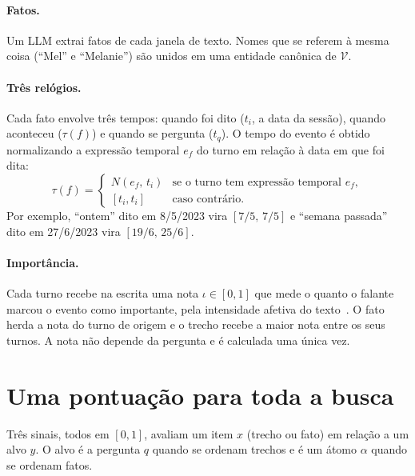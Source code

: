 \documentclass[11pt]{article}
\theoremstyle{definition}
\theoremstyle{plain}
\newcommand{\V}{\mathcal{V}}          %
\begin{document}
\paragraph{Fatos.} Um LLM extrai fatos de cada janela de texto. Nomes que se
referem à mesma coisa (``Mel'' e ``Melanie'') são unidos em uma entidade
canônica de $\V$.

\paragraph{Três relógios.} Cada fato envolve três tempos: quando foi dito
($t_i$, a data da sessão), quando aconteceu ($\tau(f)$) e quando se pergunta
($t_q$). O tempo do evento é obtido normalizando a expressão temporal $e_f$ do
turno em relação à data em que foi dita:
\begin{equation}
\label{eq:tempo}
\tau(f)=
\begin{cases}
N(e_f,\,t_i) & \text{se o turno tem expressão temporal } e_f,\\
[t_i,t_i] & \text{caso contrário.}
\end{cases}
\end{equation}
Por exemplo, ``ontem'' dito em 8/5/2023 vira $[7/5,\,7/5]$ e ``semana
passada'' dito em 27/6/2023 vira $[19/6,\,25/6]$.

\paragraph{Importância.} Cada turno recebe na escrita uma nota
$\iota\in[0,1]$ que mede o quanto o falante marcou o evento como importante,
pela intensidade afetiva do texto~\citep{flexa2026bridging,mcgaugh2004amygdala}.
O fato herda a nota do turno de origem e o trecho recebe a maior nota entre os
seus turnos. A nota não depende da pergunta e é calculada uma única vez.

\section{Uma pontuação para toda a busca}
\label{sec:pontuacao}

Três sinais, todos em $[0,1]$, avaliam um item $x$ (trecho ou fato) em relação
a um alvo $y$. O alvo é a pergunta $q$ quando se ordenam trechos e é um átomo
$\alpha$ quando se ordenam fatos.
\end{document}
